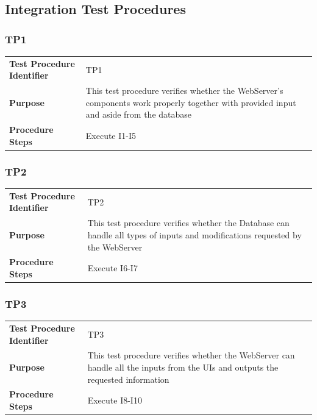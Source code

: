 \documentclass{article}
\begin{document}
\subsection{Integration Test Procedures}
\subsubsection{TP1}
\begin{adjustbox}{width=1.2\textwidth}	
	\begin{tabular}{*{2}{p{}}}
		\midrule
		\textbf{Test Procedure Identifier} & TP1\\
		\textbf{Purpose} & This test procedure verifies whether the WebServer's components work properly together with provided input and aside from the database\\ 
		\textbf{Procedure Steps} & Execute I1-I5\\
		\bottomrule
	\end{tabular}
\end{adjustbox}
\subsubsection{TP2}
\begin{adjustbox}{width=1.2\textwidth}	
	\begin{tabular}{*{2}{p{}}}
		\midrule
		\textbf{Test Procedure Identifier} & TP2\\
		\textbf{Purpose} & This test procedure verifies whether the Database can handle all types of inputs and modifications requested by the WebServer\\ 
		\textbf{Procedure Steps} & Execute I6-I7\\
		\bottomrule
	\end{tabular}
\end{adjustbox}
\subsubsection{TP3}
\begin{adjustbox}{width=1.2\textwidth}	
	\begin{tabular}{*{2}{p{}}}
		\midrule
		\textbf{Test Procedure Identifier} & TP3\\
		\textbf{Purpose} & This test procedure verifies whether the WebServer can handle all the inputs from the UIs and outputs the requested information\\ 
		\textbf{Procedure Steps} & Execute I8-I10\\
		\bottomrule
	\end{tabular}
\end{adjustbox}
\end{document}
